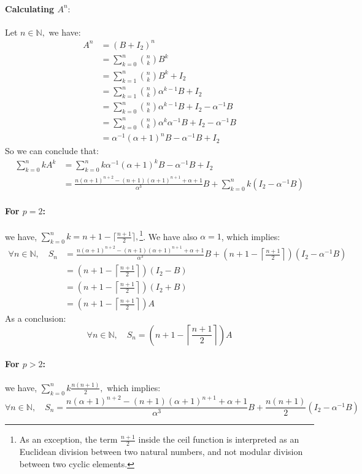 \documentclass[]{article}
\begin{document}
\paragraph{Calculating $A^n:$}
Let $n\in\mathbb{N},$ we have:
\begin{align*}
	A^n&= (B+I_2)^n\\
	&= \sum_{k=0}^n {n \choose k} B^k \\
	&= \sum_{k=1}^n {n \choose k} B^k +I_2\\
	&= \sum_{k=1}^n {n \choose k} \alpha^{k-1}B +I_2\\
	&= \sum_{k=0}^n {n \choose k} \alpha^{k-1}B +I_2 - \alpha^{-1}B\\
	&= \sum_{k=0}^n {n \choose k} \alpha^{k}\alpha^{-1}B +I_2 - \alpha^{-1}B\\
	&=\alpha^{-1}(\alpha+1)^nB-\alpha^{-1}B+I_2
\end{align*}
So we can conclude that:
\begin{align*}
\sum_{k=0}^n kA^k&=\sum_{k=0}^n k\alpha^{-1}(\alpha+1)^kB-\alpha^{-1}B+I_2 \\
&= \frac{n(\alpha+1)^{n+2}-(n+1)(\alpha+1)^{n+1}+\alpha+1}{\alpha^3}B+\sum_{k=0}^nk(I_2-\alpha^{-1}B)
\end{align*}
\paragraph{For $p=2$:}
we have, $\sum_{k=0}^nk=n+1-\lceil \frac{n+1}{2}\rceil,$\footnote{As an exception, the term $\frac{n+1}{2}$ inside the ceil function is interpreted as an Euclidean division between two natural numbers, and not modular division between two cyclic elements.}. 
\newline 
We have also $\alpha=1$, which implies:
\begin{align*}
\forall n\in\mathbb{N}, \quad S_n &= \frac{n(\alpha+1)^{n+2}-(n+1)(\alpha+1)^{n+1}+\alpha+1}{\alpha^3}B+\left(n+1-\left\lceil \frac{n+1}{2}\right\rceil\right)\left(I_2-\alpha^{-1}B\right)\\
&=\left(n+1-\left\lceil \frac{n+1}{2}\right\rceil\right)\left(I_2-B\right)\\
&=\left(n+1-\left\lceil \frac{n+1}{2}\right\rceil\right)\left(I_2+B\right)\\
&=\left(n+1-\left\lceil \frac{n+1}{2}\right\rceil\right)A
\end{align*}
As a conclusion:
$$
\boxed{\forall n\in\mathbb{N}, \quad S_n=\left(n+1-\left\lceil \frac{n+1}{2}\right\rceil\right)A}
$$

\paragraph{For $p>2$:}
we have, $\sum_{k=0}^nk\frac{n(n+1)}{2},$ which implies:
$$
\boxed{\forall n\in\mathbb{N}, \quad S_n = \frac{n(\alpha+1)^{n+2}-(n+1)(\alpha+1)^{n+1}+\alpha+1}{\alpha^3}B+\frac{n(n+1)}{2}\left(I_2-\alpha^{-1}B\right)}
$$
\end{document}
